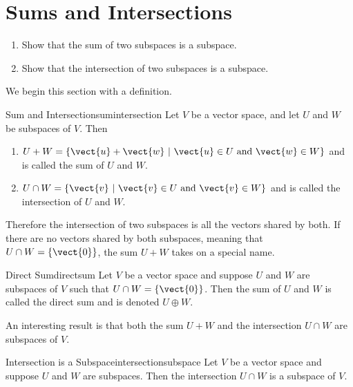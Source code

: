 \section{Sums and Intersections}

\begin{outcome}
\begin{enumerate}
\item[A.] Show that the sum of two subspaces is a subspace.

\item[B.] Show that the intersection of two subspaces is a subspace.
\end{enumerate}
\end{outcome}

We begin this section with a definition.

\begin{definition}{Sum and Intersection}{sumintersection}
Let $V$ be a vector space, and let $U$ and $W$ be subspaces of
$V$.  
Then
\begin{enumerate}
\item $U+W = \{ \vect{u}+\vect{w} ~|~ \vect{u}\in U\mbox{ and } \vect{w}\in W\}$ and is 
called the sum of $U$ and $W$.

\item $U\cap W = \{ \vect{v} ~|~ \vect{v}\in U\mbox{ and } \vect{v}\in W\}$ and is 
called the intersection of $U$ and $W$.
\end{enumerate}
\end{definition}

Therefore the intersection of two subspaces is all the vectors shared by both. If there are no vectors shared by both subspaces, meaning that $U \cap W = \left\{ \vect{0} \right\}$, the sum $U+W$ takes on a special name.

\begin{definition}{Direct Sum}{directsum}
Let $V$ be a vector space and suppose $U$ and $W$ are subspaces of $V$ such that  $U \cap W = \left\{ \vect{0} \right\}$. Then the sum of $U$ and $W$ is called the direct sum and is denoted $U \oplus W$. 
\end{definition}

An interesting result is that both the sum $U + W$ and the intersection $U \cap W$ are subspaces of $V$. 

\begin{example}{Intersection is a Subspace}{intersectionsubspace}
Let $V$ be a vector space and suppose $U$ and $W$ are subspaces. Then the intersection $U \cap W$ is a subspace of $V$.
\end{example}

